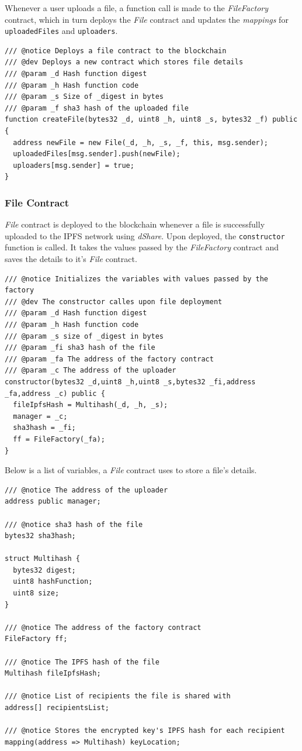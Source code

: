 \documentclass[]{article}
\begin{document}
		Whenever a user uploads a file, a function call is made to the \textit{FileFactory} contract, which in turn deploys the \textit{File} contract and updates the \textit{mappings} for \texttt{uploadedFiles} and \texttt{uploaders}.
		
\begin{verbatim}
/// @notice Deploys a file contract to the blockchain
/// @dev Deploys a new contract which stores file details
/// @param _d Hash function digest
/// @param _h Hash function code
/// @param _s Size of _digest in bytes
/// @param _f sha3 hash of the uploaded file
function createFile(bytes32 _d, uint8 _h, uint8 _s, bytes32 _f) public {
  address newFile = new File(_d, _h, _s, _f, this, msg.sender);
  uploadedFiles[msg.sender].push(newFile);
  uploaders[msg.sender] = true;
}
\end{verbatim}

		\subsubsection{File Contract}
		\textit{File} contract is deployed to the blockchain whenever a file is successfully uploaded to the IPFS network using \textit{dShare}. Upon deployed, the \texttt{constructor} function is called. It takes the values passed by the \textit{FileFactory} contract and saves the details to it's \textit{File} contract.
		
\begin{verbatim}
/// @notice Initializes the variables with values passed by the factory
/// @dev The constructor calles upon file deployment
/// @param _d Hash function digest
/// @param _h Hash function code
/// @param _s size of _digest in bytes
/// @param _fi sha3 hash of the file
/// @param _fa The address of the factory contract
/// @param _c The address of the uploader
constructor(bytes32 _d,uint8 _h,uint8 _s,bytes32 _fi,address _fa,address _c) public {
  fileIpfsHash = Multihash(_d, _h, _s);
  manager = _c;
  sha3hash = _fi;
  ff = FileFactory(_fa);
}
\end{verbatim}

		Below is a list of variables, a \textit{File} contract uses to store a file's details.
		
\begin{verbatim}
/// @notice The address of the uploader
address public manager;

/// @notice sha3 hash of the file
bytes32 sha3hash;

struct Multihash {
  bytes32 digest;
  uint8 hashFunction;
  uint8 size;
}

/// @notice The address of the factory contract
FileFactory ff;

/// @notice The IPFS hash of the file
Multihash fileIpfsHash;

/// @notice List of recipients the file is shared with
address[] recipientsList;

/// @notice Stores the encrypted key's IPFS hash for each recipient
mapping(address => Multihash) keyLocation;
\end{verbatim}
		
\end{document}
